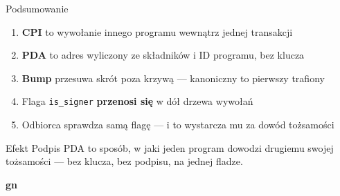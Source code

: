 \begin{frame}{Podsumowanie}
  \begin{enumerate}
    \item \textbf{CPI} to wywołanie innego programu wewnątrz jednej transakcji
    \item \textbf{PDA} to adres wyliczony ze składników i ID programu, bez klucza
    \item \textbf{Bump} przesuwa skrót poza krzywą --- kanoniczny to pierwszy trafiony
    \item Flaga \texttt{is\_signer} \textbf{przenosi się} w dół drzewa wywołań
    \item Odbiorca sprawdza samą flagę --- i to wystarcza mu za dowód tożsamości
  \end{enumerate}
  \vspace{0.2cm}
  \begin{exampleblock}{Efekt}
    Podpis PDA to sposób, w jaki jeden program dowodzi drugiemu swojej
    tożsamości --- bez klucza, bez podpisu, na jednej fladze.
  \end{exampleblock}
\end{frame}

\begin{frame}[plain]
  \begin{center}
    \vfill
    {\Huge\bfseries\color{stplwhite} gn}
    \vfill
  \end{center}
\end{frame}


